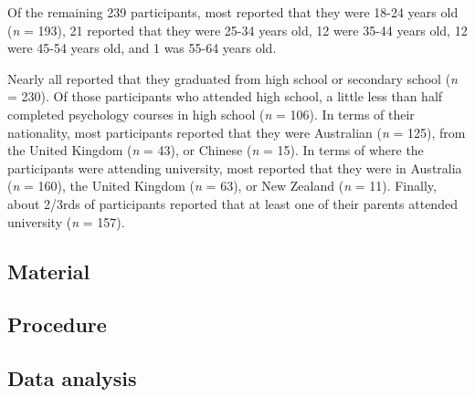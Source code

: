 \documentclass[
  man,mask,floatsintext]{apa6}
\begin{document}
Of the remaining 239 participants, most reported that they were
18-24 years old (\emph{n} = 193), 21
reported that they were 25-34 years old, 12 were 35-44 years old,
12 were 45-54 years old, and 1 was 55-64 years old.

Nearly all reported that they graduated from high
school or secondary school (\emph{n} = 230). Of those participants who
attended high school, a little less than half completed psychology courses in
high school (\emph{n} = 106). In terms of their nationality, most
participants reported that they were Australian (\emph{n} = 125),
from the United Kingdom (\emph{n} = 43), or Chinese
(\emph{n} = 15). In terms of where the participants were attending
university, most reported that they were in Australia (\emph{n} = 160),
the United Kingdom (\emph{n} = 63), or New Zealand (\emph{n} = 11).
Finally, about 2/3rds of participants reported that at least one of their parents
attended university (\emph{n} = 157).

\hypertarget{material}{%
\subsection{Material}\label{material}}

\hypertarget{procedure}{%
\subsection{Procedure}\label{procedure}}

\hypertarget{data-analysis}{%
\subsection{Data analysis}\label{data-analysis}}
\end{document}
